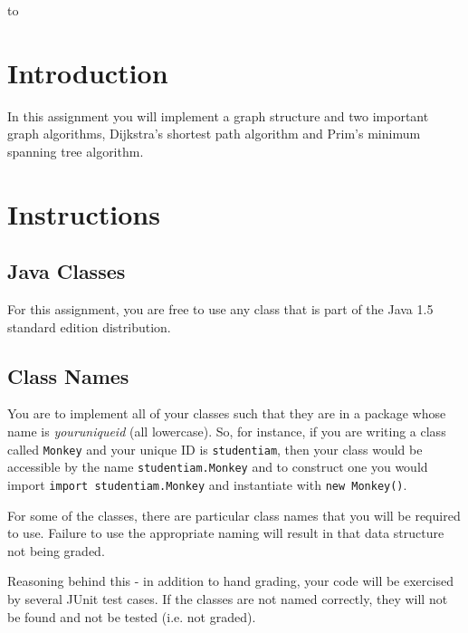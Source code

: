 \documentclass[11pt]{article}
\begin{document}
\begin{center} 
\end{center} 

\vspace{0.1in} 
\hbox to \textwidth{Name:\enspace\hrulefill} 

\section*{Introduction}
In this assignment you will implement a graph structure and two important graph algorithms, Dijkstra's shortest path algorithm and Prim's minimum spanning tree algorithm.

\section*{Instructions}
\subsection*{Java Classes}
For this assignment, you are free to use any class that is part of the Java 1.5 standard edition distribution.  

\subsection*{Class Names}
You are to implement all of your classes such that they are in a package whose name is {\it youruniqueid} (all lowercase).  So, for instance, if you are writing a class called {\tt Monkey} and your unique ID is {\tt studentiam}, then your class would be accessible by the name {\tt studentiam.Monkey} and to construct one you would import {\tt import studentiam.Monkey} and instantiate with {\tt new Monkey()}.
\par
For some of the classes, there are particular class names that you will be required to use.   Failure to use the appropriate naming will result in that data structure not being graded.
\par
Reasoning behind this - in addition to hand grading, your code will be exercised by several JUnit test cases.   If the classes are not named correctly, they will not be found and not be tested (i.e. not graded).
\end{document}
